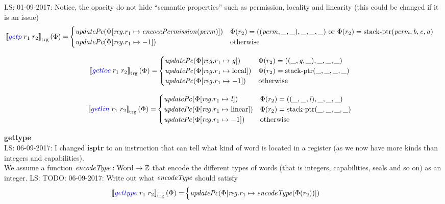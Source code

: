 \documentclass[a4paper]{article}
\newcommand\lau[1]{{\color{purple} \sf \footnotesize {LS: #1}}\\}
\newcommand{\sem}[1]{\left\llbracket #1 \right\rrbracket}
\newcommand{\tsem}[2][\Phi]{\sem{#2}_{\mathrm{trg}}(#1)}
\newcommand{\totherwise}{\text{otherwise }}
\newcommand{\sourcecolor}[1]{\color{blue}}
\newcommand{\src}[1]{{\sourcecolor{} #1}}
\newcommand{\zinstr}[1]{#1}
\newcommand{\twoinstr}[3]{
  \ifthenelse{\equal{#2#3}{}}
  {\zinstr{#1}}
  {\zinstr{#1} \; #2 \; #3}
}
\newcommand{\sisptr}[2]{\twoinstr{\src{gettype}}{#1}{#2}}
\newcommand{\sgetp}[2]{\twoinstr{\src{getp}}{#1}{#2}}
\newcommand{\sgetloc}[2]{\twoinstr{\src{getloc}}{#1}{#2}}
\newcommand{\sgetlin}[2]{\twoinstr{\src{getlin}}{#1}{#2}}
\newcommand{\ints}{\mathbb{Z}}
\newcommand{\update}[2]{[#1 \mapsto #2]}
\newcommand{\updReg}[2]{\update{\reg.#1}{#2}}
\newcommand{\shareddom}[1]{\mathrm{#1}}
\newcommand{\Word}{\shareddom{Word}}
\newcommand{\perm}{\var{perm}}
\newcommand{\gl}{\var{g}}
\newcommand{\lin}{\var{l}}
\newcommand{\stkptr}[1]{\mathrm{stack\text{-}ptr}(#1)}
\newcommand{\var}[1]{\mathit{#1}}
\newcommand{\reg}{\var{reg}}
\newcommand{\baddr}{\var{b}}
\newcommand{\eaddr}{\var{e}}
\newcommand{\aaddr}{\var{a}}
\newcommand{\plainlocality}[1]{\mathrm{#1}}
\newcommand{\local}{\plainlocality{local}}
\newcommand{\plainlinearity}[1]{\mathrm{#1}}
\newcommand{\linear}{\plainlinearity{linear}}
\newcommand{\plainfun}[2]{
  \ifthenelse{\equal{#2}{}}
  {\mathit{#1}}
  {\mathit{#1}(#2)}
}
\newcommand{\encType}[1]{\plainfun{encodeType}{#1}}
\newcommand{\encPerm}[1]{\plainfun{encocePermission}{#1}}
\newcommand{\updPcAddr}[1]{\plainfun{updatePc}{#1}}
\begin{document}
\lau{01-09-2017: Notice, the opacity do not hide ``semantic properties'' such as permission, locality and linearity (this could be changed if it is an issue)}

\begin{align*}
  \tsem{\sgetp{r_1}{r_2}} = & 
                              \begin{cases}
                                \updPcAddr{}(\Phi\update{\reg.r_1}{\encPerm{\perm}}) & \Phi(r_2) = ((\perm,\_,\_),\_,\_,\_) \text{ or } \Phi(r_2) = \stkptr{\perm,\baddr,\eaddr,\aaddr}\\
                                \updPcAddr{\Phi\updReg{r_1}{-1}} & \totherwise
                              \end{cases}
\end{align*}

\begin{align*}
  \tsem{\sgetloc{r_1}{r_2}} = &                              
                              \begin{cases}
                                \updPcAddr{}(\Phi\update{\reg.r_1}{\gl}) & \Phi(r_2) = ((\_,\gl,\_),\_,\_,\_) \\
                                \updPcAddr{\Phi\updReg{r_1}{\local}} & \Phi(r_2) = \stkptr{\_,\_,\_,\_}\\
                                \updPcAddr{\Phi\updReg{r_1}{-1}} & \totherwise
                              \end{cases}
\end{align*}

\begin{align*}
  \tsem{\sgetlin{r_1}{r_2}} = &                              
                              \begin{cases}
                                \updPcAddr{}(\Phi\update{\reg.r_1}{\lin}) & \Phi(r_2) = ((\_,\_,\lin),\_,\_,\_) \\
                                \updPcAddr{\Phi\updReg{r_1}{\linear}} & \Phi(r_2) = \stkptr{\_,\_,\_,\_}\\
                                \updPcAddr{\Phi\updReg{r_1}{-1}} & \totherwise
                              \end{cases}
\end{align*}

\textbf{gettype}\\
\lau{06-09-2017: I changed \textbf{isptr} to an instruction that can tell what kind of word is located in a register (as we now have more kinds than integers and capabilities).}
We assume a function $\encType{} : \Word \rightarrow \ints$ that encode the different types of words (that is integers, capabilities, seals and so on) as an integer.
\lau{TODO: 06-09-2017: Write out what $\encType{}$ should satisfy}
\begin{align*}
  \tsem{\sisptr{r_1}{r_2}} = & 
                               \begin{cases}
                                 \updPcAddr{}(\Phi\updReg{r_1}{\encType{\Phi(r_2)}})
                               \end{cases}
\end{align*}
\end{document}
